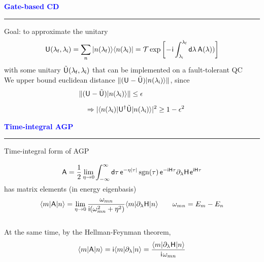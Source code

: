 \documentclass{beamer}
\def\gemph#1{{\color{mygreen}#1}}
\def\lbt{} %
\DeclareMathOperator{\sgn}{sgn}
\def\mt#1{\kern0.025em\mathsf{#1}\kern0.025em}
\def\d{\mathsf d}
\def\e{\mathsf e}
\def\i{\mathsf i}
\def\lambdai{{\lambda_{\sf i}}}
\def\lambdaf{{\lambda_{\sf f}}}
\def\A{\mt A}
\def\H{\mt H}
\def\+{\kern0.0833em}
\newenvironment{dia}[2]
{
	\begin{frame}
	\vspace{1mm}
	{\small #1}
	\hfill
    {\small\bf\textcolor{blue}{#2}}
	\vspace{3mm}
	\hrule
	\bigskip
}
{
	\vfill
	\end{frame}
}
\begin{document}
\begin{dia}{\lbt}{Gate-based CD}
Goal: to approximate the unitary
\begin{align*}
    \mt U(\lambdaf, \lambdai) = \sum_n \ket{n(\lambdaf)}\bra{n(\lambdai)} = \mathcal T \exp \bigg[ \! -\!\i \int_\lambdai^\lambdaf \d\lambda \, \mt A(\lambda)) \bigg]
\end{align*}
with some unitary $\tilde{\mt U}(\lambdaf, \lambdai)$ that can be implemented on a fault-tolerant QC \\[6mm] \pause
We upper bound euclidean distance $\|(\mt U - \tilde{\mt U})\ket{n(\lambdai)}\|$, since
\begin{align*}
    \|(&\mt U - \tilde{\mt U})\ket{n(\lambdai)}\| \leq \epsilon \nonumber \\[2mm]
    &\Rightarrow |\bra{n(\lambdai)} \mt U\t \tilde{\mt U} \ket{n(\lambdai)}|^2 \geq 1 - \epsilon^2
\end{align*}
\vspace*{-1.4cm}
\end{dia}

\begin{dia}{\lbt}{Time-integral AGP}
\gemph{Time-integral form} of AGP
\begin{align*}
    \A = \frac12 \lim_{\eta\to0} \int_{-\infty}^\infty \d\tau \, \e^{-\eta|\tau|} \sgn(\tau) \, \e^{-\i\H\tau} \partial_\lambda \H \+ \e^{\i\H\tau} \\[-8mm]
\end{align*} \pause
$ $\\[-2mm]
has matrix elements (in energy eigenbasis)
\begin{align*}
    \bra m \mt A \ket n = \lim_{\eta\to0} \frac{\omega_{mn}}{\i(\omega_{mn}^2 + \eta^2)} \bra m \partial_\lambda \mt H \ket n \quad \quad \omega_{mn} = E_m - E_n
\end{align*} \pause
$ $\\[2mm]
At the same time, by the Hellman-Feynman theorem,
\begin{align*}
    \bra m \A \ket n = \i \bra m \partial_\lambda \ket n = \frac{\bra m \partial_\lambda\H \ket n}{\i \+ \omega_{mn}}
\end{align*} 
\vspace{-1.4cm}
\end{dia}
\end{document}
